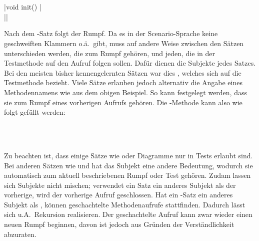 \\
\\
\jcode|void init() {|\\
\jcode|}|

Nach dem -Satz folgt der Rumpf.
Da es in der Scenario-Sprache keine geschweiften Klammern o.ä.\ gibt,
muss auf andere Weise zwischen den Sätzen unterschieden werden, die zum Rumpf gehören,
und jeden, die in der Testmethode auf den Aufruf folgen sollen.
Dafür dienen die Subjekte jedes Satzes.
Bei den meisten bisher kennengelernten Sätzen war dies , welches sich auf die Testmethode bezieht.
Viele Sätze erlauben jedoch alternativ die Angabe eines Methodennamens wie  aus dem obigen Beispiel.
So kann festgelegt werden, dass sie zum Rumpf eines vorherigen Aufrufs gehören.
Die -Methode kann also wie folgt gefüllt werden:

\\
\\

Zu beachten ist, dass einige Sätze wie  oder Diagramme nur in Tests erlaubt sind.
Bei anderen Sätzen wie  und  hat das Subjekt eine andere Bedeutung,
wodurch sie automatisch zum aktuell beschriebenen Rumpf oder Test gehören.
Zudam lassen sich Subjekte nicht mischen;
verwendet ein Satz ein anderes Subjekt als der vorherige, wird der vorherige Aufruf geschlossen.
Hat ein -Satz ein anderes Subjekt als , können geschachtelte Methodenaufrufe stattfinden.
Dadurch lässt sich u.A.\ Rekursion realisieren.
Der geschachtelte Aufruf kann zwar wieder einen neuen Rumpf beginnen, davon ist jedoch aus Gründen der Verständlichkeit abzuraten.


